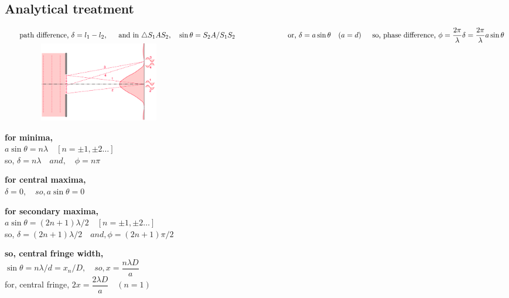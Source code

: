 \documentclass[legalpaper,10pt]{article}
\begin{document}
\begin{multicols*}{2}
	\subsection*{Analytical treatment}
	\begin{math}
		\indent\text{path difference, }\delta=l_1-l_2,
		\\\indent\text{and in }\triangle S_1AS_2, \quad \sin{\theta}=S_2A/{S_1S_2}
		\\\indent\hspace*{2cm} \text{or, }\delta=a\sin{\theta}\quad (a=d)
		\\\indent\text{so, phase difference, }\phi=\dfrac{2\pi}{\lambda}\delta=\dfrac{2\pi}{\lambda} a\sin{\theta}\\
	\end{math}
	\indent\includegraphics[width=8.5cm,height=3.5cm]{dif2.png}

	\textbf{for minima,} \\
	\hspace*{1cm}$a\sin{\theta}=n\lambda \quad [n=\pm1,\pm2\dots]$\\
	\hspace*{1cm}so, $ \delta = n\lambda \quad and, \quad \phi=n\pi$

	\textbf{for central maxima,}\\
	\hspace*{1cm}$ \delta=0,\quad so, a\sin{\theta}=0 $

	\textbf{for secondary maxima,} \\
	\hspace*{1cm}$a\sin{\theta}=(2n+1)\lambda/2 \quad [n=\pm1,\pm2\dots]$\\
	\hspace*{1cm}so, $ \delta = (2n+1)\lambda/2 \quad and, \phi=(2n+1)\pi/2$

	\textbf{so, central fringe width,}\\
	\hspace*{1cm}$\sin\theta=n\lambda/d=x_n/D, \quad so, x = \dfrac{n\lambda D}{a} $\\
	\hspace*{1cm}for, central fringe, $ 2x=\dfrac{2\lambda D}{a}\quad (n=1) $


\end{multicols*}
\end{document}
